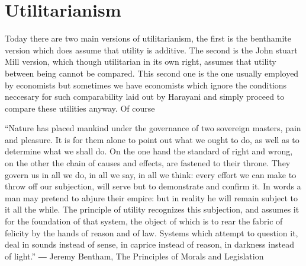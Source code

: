 \documentclass[12pt]{report}
\numberwithin{equation}{section}
\begin{document}





\section{Utilitarianism} 


Today there are two main versions of utilitarianism, the first is the benthamite version which does assume that utility is additive. The second is the John stuart Mill version, which though utilitarian in its own right, assumes that utility between being cannot be compared. This second one is the one usually employed by economists but sometimes we have economists which ignore the conditions neccesary for such comparability laid out by Harayani and simply proceed to compare these utilities anyway. Of course 


\begin{tcolorbox}[enhanced,%
  colback=green!25!black!10!white,colframe=green!75!black,title=Principle of utility (10cm),
  drop fuzzy shadow,watermark color=white,watermark text=Fit]
“Nature has placed mankind under the governance of two sovereign masters, pain and pleasure. It is for them alone to point out what we ought to do, as well as to determine what we shall do. On the one hand the standard of right and wrong, on the other the chain of causes and effects, are fastened to their throne. They govern us in all we do, in all we say, in all we think: every effort we can make to throw off our subjection, will serve but to demonstrate and confirm it. In words a man may pretend to abjure their empire: but in reality he will remain subject to it all the while. The principle of utility recognizes this subjection, and assumes it for the foundation of that system, the object of which is to rear the fabric of felicity by the hands of reason and of law. Systems which attempt to question it, deal in sounds instead of sense, in caprice instead of reason, in darkness instead of light.”
― Jeremy Bentham, The Principles of Morals and Legislation
\end{tcolorbox}
\end{document}
